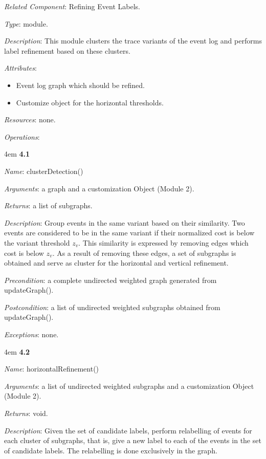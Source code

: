 \documentclass[notitlepage]{article}
\begin{document}
\begin{flushleft}
\textit{Related Component}: Refining Event Labels.

\textit{Type}: module.

\textit{Description}: This module clusters the trace variants of the event log and performs label refinement based on these clusters.

\textit{Attributes}: \begin{itemize}
	\item Event log graph which should be refined.
	\item Customize object for the horizontal thresholds.
\end{itemize}

\textit{Resources}: none.

\textit{Operations}: 
\medskip

\par
\begingroup
\leftskip4em
\textbf{4.1} 

\textit{Name}: clusterDetection()

\textit{Arguments}: a graph and a customization Object (Module 2).

\textit{Returns}: a list of subgraphs.

\textit{Description}: Group events in the same variant based on their similarity. Two events are considered to be in the same variant if their normalized cost is below the variant threshold $z_v$. This similarity is expressed by removing edges which cost is below $z_v$. As a result of removing these edges, a set of subgraphs is obtained and serve as cluster for the horizontal and vertical refinement. 

\textit{Precondition}: a complete undirected weighted graph generated from updateGraph().

\textit{Postcondition}: a list of undirected weighted subgraphs obtained from updateGraph().

\textit{Exceptions}: none.
\par
\endgroup

\medskip

\par
\begingroup
\leftskip4em
\textbf{4.2} 

\textit{Name}: horizontalRefinement()

\textit{Arguments}: a list of undirected weighted subgraphs and a customization Object (Module 2).

\textit{Returns}: void.

\textit{Description}: Given the set of candidate labels, perform relabelling of events for each cluster of subgraphs, that is, give a new label to each of the events in the set of candidate labels. The relabelling is done exclusively in the graph.


\end{flushleft}
\end{document}
